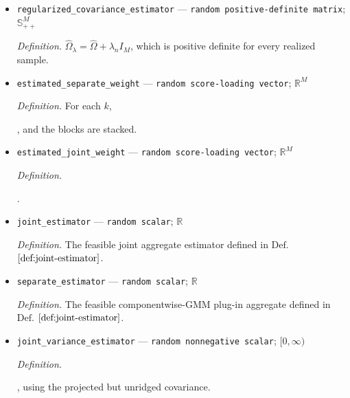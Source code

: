 \documentclass{article}
\begin{document}
\begin{itemize}
  \item \texttt{regularized\_\allowbreak{}covariance\_\allowbreak{}estimator} --- \texttt{random positive-\allowbreak{}definite matrix}; \(\mathbb S_{++}^M\)
  \par\smallskip\noindent\emph{Definition.} \(\widehat\Omega_{\lambda}=\widehat\Omega+\lambda_n I_M\), which is positive definite for every realized sample.
  \item \texttt{estimated\_\allowbreak{}separate\_\allowbreak{}weight} --- \texttt{random score-\allowbreak{}loading vector}; \(\mathbb R^M\)
  \par\smallskip\noindent\emph{Definition.} For each \(k\), \leavevmode\par\noindent {}\par\noindent, and the blocks are stacked.
  \item \texttt{estimated\_\allowbreak{}joint\_\allowbreak{}weight} --- \texttt{random score-\allowbreak{}loading vector}; \(\mathbb R^M\)
  \par\smallskip\noindent\emph{Definition.} \leavevmode\par\noindent {}\par\noindent.
  \item \texttt{joint\_\allowbreak{}estimator} --- \texttt{random scalar}; \(\mathbb R\)
  \par\smallskip\noindent\emph{Definition.} The feasible joint aggregate estimator defined in \(\mathrm{Def.}\) \(\ref{def:joint-estimator}\).
  \item \texttt{separate\_\allowbreak{}estimator} --- \texttt{random scalar}; \(\mathbb R\)
  \par\smallskip\noindent\emph{Definition.} The feasible componentwise-GMM plug-in aggregate defined in \(\mathrm{Def.}\) \(\ref{def:joint-estimator}\).
  \item \texttt{joint\_\allowbreak{}variance\_\allowbreak{}estimator} --- \texttt{random nonnegative scalar}; \([0,\infty)\)
  \par\smallskip\noindent\emph{Definition.} \leavevmode\par\noindent {}\par\noindent, using the projected but unridged covariance.

\end{itemize}
\end{document}

